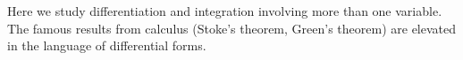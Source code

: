 
Here we study differentiation and integration
involving more than one variable.
The famous results from calculus (Stoke's theorem, Green's theorem)
are elevated in the language of differential forms.